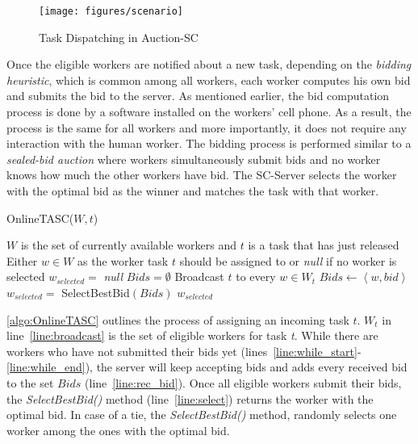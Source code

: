 \begin{figure}[h]
   \centering
    \texttt{[image: figures/scenario]}
    \vspace{-0.15in}
    \caption{Task Dispatching in Auction-SC}
    \label{fig:dispatch}
\end{figure}

Once the eligible workers are notified about a new task, depending on the \textit{bidding heuristic}, which is common among all workers, each worker computes his own bid and submits the bid to the server. As mentioned earlier, the bid computation process is done by a software installed on the workers' cell phone. As a result, the process is the same for all workers and more importantly, it does not require any interaction with the human worker. The bidding process is performed similar to a \textit{sealed-bid auction} where workers simultaneously submit bids and no worker knows how much the other workers have bid. The SC-Server selects the worker with the optimal bid as the winner and matches the task with that worker.

\begin{algorithm}
\caption{OnlineTASC($W, t$)}
\label{algo:OnlineTASC}
\begin{algorithmic}[1]
\REQUIRE $W$ is the set of currently available workers and $t$ is a task that has just released
\ENSURE Either $w \in W$ as the worker task $t$ should be assigned to or \emph{null} if no worker is selected
\STATE $w_{selected} = $ \emph{null}
\STATE $Bids = \emptyset$
\STATE Broadcast $t$ to every $w \in W_t$ \label{line:broadcast}
\label{line:while_start}
	\STATE $Bids \leftarrow \left\langle w, bid \right\rangle$ \label{line:rec_bid}
\ENDWHILE \label{line:while_end}
\STATE $w_{selected} = $ SelectBestBid$(Bids)$ \label{line:select}
\RETURN $w_{selected}$
\end{algorithmic}
\end{algorithm}

\cref{algo:OnlineTASC} outlines the process of assigning an incoming task $t$. $W_t$ in line~\ref{line:broadcast} is the set of eligible workers for task \textit{t}. While there are workers who have not submitted their bids yet (lines~\ref{line:while_start}-\ref{line:while_end}), the server will keep accepting bids and adds every received bid to the set $Bids$ (line~\ref{line:rec_bid}). Once all eligible workers submit their bids, the \emph{SelectBestBid()} method (line~\ref{line:select}) returns the worker with the optimal bid. In case of a tie, the \emph{SelectBestBid()} method, randomly selects one worker among the ones with the optimal bid.

